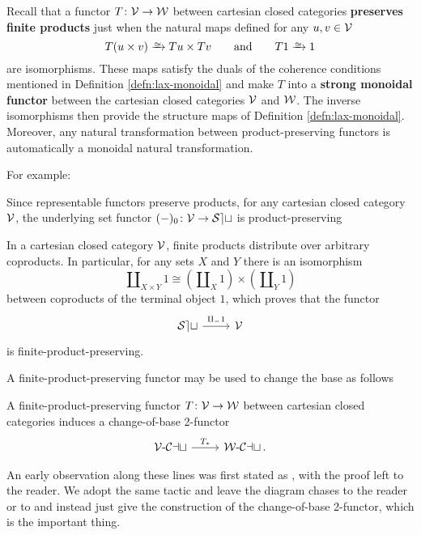 Recall that a functor $T \colon {\mathord{\mathcal{V}}} \to {\mathord{\mathcal{W}}}$ between cartesian closed categories \textbf{preserves finite products} just when the natural maps defined for any $u,v \in {\mathord{\mathcal{V}}}$
\[ T(u \times v) \isoto Tu \times Tv \qquad \text{and} \qquad T1 \isoto 1\]
are isomorphisms. These maps satisfy the duals of the coherence conditions mentioned in Definition \ref{defn:lax-monoidal} and  make $T$ into a \textbf{strong monoidal functor} between the cartesian closed categories ${\mathord{\mathcal{V}}}$ and ${\mathord{\mathcal{W}}}$. The inverse isomorphisms then provide the structure maps of Definition \ref{defn:lax-monoidal}. Moreover, any natural transformation between product-preserving functors is automatically a monoidal natural transformation.

For example:


\begin{ex}\label{ex:lax-u-set} Since representable functors preserve products, for any cartesian closed category ${\mathord{\mathcal{V}}}$, the underlying set functor $(-)_0 \colon {\mathord{\mathcal{V}}} \to {\mathord{\mathcal{Set}}}$ is product-preserving
\end{ex}

\begin{ex}\label{ex:strong-free} In a cartesian closed category ${\mathord{\mathcal{V}}}$, finite products distribute over arbitrary coproducts. In particular, for any sets $X$ and $Y$ there is an isomorphism
\[ \amalg_{X \times Y} 1 \cong (\amalg_X 1) \times (\amalg_Y 1)\] between coproducts of the terminal object $1$, which proves that the functor
\[
\begin{tikzcd} \Set \arrow[r, "{\amalg_{-} 1}"] & \cV
\end{tikzcd}
\] is finite-product-preserving.
\end{ex}

A finite-product-preserving functor may be used to change the base as follows

\begin{prop}\label{prop:change-of-base} A finite-product-preserving functor $T \colon {\mathord{\mathcal{V}}} \to {\mathord{\mathcal{W}}}$ between cartesian closed categories induces a change-of-base 2-functor \[ \begin{tikzcd} \eCat{\cV} \arrow[r, "T_*"] & \eCat{\cW}\, . \end{tikzcd}\]
\end{prop}

An early observation along these lines was first stated as \cite[II.6.3]{EilenbergKelly:1966cc}, with the proof left to the reader. We adopt the same tactic and leave the diagram chases to the reader or to \cite[4.2.4]{Cruttwell:2008rr} and instead just give the construction of the change-of-base 2-functor, which is the important thing.

